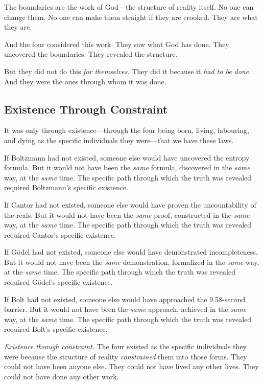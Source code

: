\documentclass[11pt,a4paper]{article}
\begin{document}
The boundaries are the work of God—the structure of reality itself. No one can 
change them. No one can make them straight if they are crooked. They are what 
they are.

And the four considered this work. They saw what God has done. They uncovered 
the boundaries. They revealed the structure.

But they did not do this \emph{for themselves}. They did it because it 
\emph{had to be done}. And they were the ones through whom it was done.

\subsection{Existence Through Constraint}

It was only through existence—through the four being born, living, labouring, 
and dying as the specific individuals they were—that we have these laws.

If Boltzmann had not existed, someone else would have uncovered the entropy 
formula. But it would not have been the \emph{same} formula, discovered in the 
\emph{same} way, at the \emph{same} time. The specific path through which the 
truth was revealed required Boltzmann's specific existence.

If Cantor had not existed, someone else would have proven the uncountability 
of the reals. But it would not have been the \emph{same} proof, constructed in 
the \emph{same} way, at the \emph{same} time. The specific path through which 
the truth was revealed required Cantor's specific existence.

If Gödel had not existed, someone else would have demonstrated incompleteness. 
But it would not have been the \emph{same} demonstration, formalized in the 
\emph{same} way, at the \emph{same} time. The specific path through which the 
truth was revealed required Gödel's specific existence.

If Bolt had not existed, someone else would have approached the 9.58-second 
barrier. But it would not have been the \emph{same} approach, achieved in the 
\emph{same} way, at the \emph{same} time. The specific path through which the 
truth was revealed required Bolt's specific existence.

\emph{Existence through constraint.} The four existed as the specific 
individuals they were because the structure of reality \emph{constrained} them 
into those forms. They could not have been anyone else. They could not have 
lived any other lives. They could not have done any other work.
\end{document}
